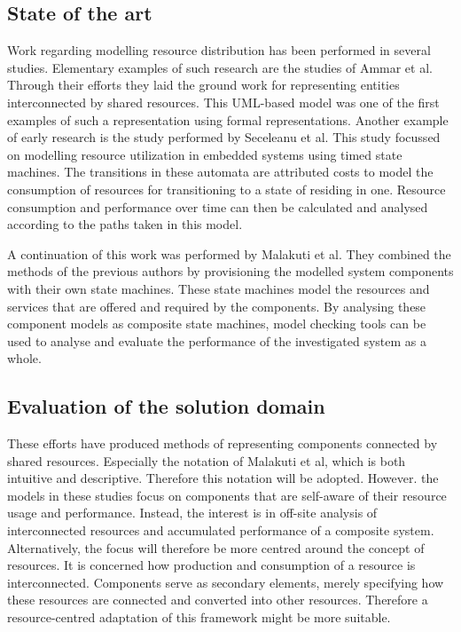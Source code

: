 \subsection{State of the art}
Work regarding modelling resource distribution has been performed in several studies. Elementary examples of such research are the studies of Ammar et al\cite{rum_basis_2}. Through their efforts they laid the ground work for representing entities interconnected by shared resources. This UML-based model was one of the first examples of such a representation using formal representations. Another example of early research is the study performed by Seceleanu et al\cite{rum_basis_89}. This study focussed on modelling resource utilization in embedded systems using timed state machines. The transitions in these automata are attributed costs to model the consumption of resources for transitioning to a state of residing in one. Resource consumption and performance over time  can then be calculated and analysed according to the paths taken in this model.

A continuation of this work was performed by Malakuti et al\cite{steven_te_brinke}. They combined the methods of the previous authors by provisioning the modelled system components with their own state machines. These state machines model the resources and services that are offered and required by the components. By analysing these component models as composite state machines, model checking tools can be used to analyse and evaluate the performance of the investigated system as a whole.

\subsection{Evaluation of the solution domain}
These efforts have produced methods of representing components connected by shared resources. Especially the notation of Malakuti et al\cite{steven_te_brinke}, which is both intuitive and descriptive. Therefore this notation will be adopted. However. the models in these studies focus on components that are self-aware of their resource usage and performance. Instead, the interest is in off-site analysis of interconnected resources and accumulated performance of a composite system. Alternatively, the focus will therefore be more centred around the concept of resources. It is concerned how production and consumption of a resource is interconnected. Components serve as secondary elements, merely specifying how these resources are connected and converted into other resources. Therefore a resource-centred adaptation of this framework might be more suitable.


